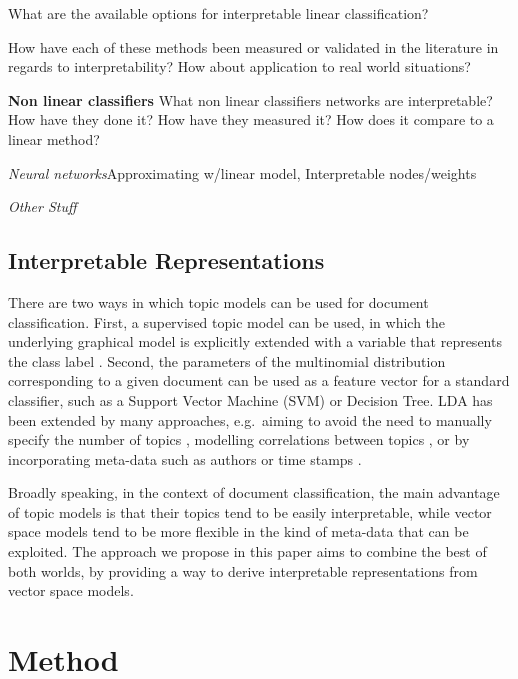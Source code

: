 What are the available options for interpretable linear classification?

How have each of these methods been measured or validated in the literature in regards to interpretability? How about application to real world situations?

\textbf{Non linear classifiers}
What non linear classifiers networks are interpretable? How have they done it? How have they measured it? How does it compare to a linear method?

\textit {Neural networks}Approximating w/linear model, Interpretable nodes/weights

\textit {Other Stuff}

\subsection{Interpretable Representations}


There are two ways in which topic models can be used for document classification. First, a supervised topic model can be used, in which the underlying graphical model is explicitly extended with a variable that represents the class label \cite{Blei2010}. Second, the parameters of the multinomial distribution corresponding to a given document can be used as a feature vector for a standard classifier, such as a Support Vector Machine (SVM) or Decision Tree. LDA has been extended by many approaches, e.g.\ aiming to avoid the need to manually specify the number of topics \cite{teh2005sharing}, modelling correlations between topics \cite{Blei2006}, or by incorporating meta-data such as authors \cite{rosen2004author} or time stamps \cite{wang2006topics}.


Broadly speaking, in the context of document classification, the main advantage of topic models is that their topics tend to be easily interpretable, while vector space models tend to be more flexible in the kind of meta-data that can be exploited. The approach we propose in this paper aims to combine the best of both worlds, by providing a way to derive interpretable representations from vector space models.



\section{Method}

